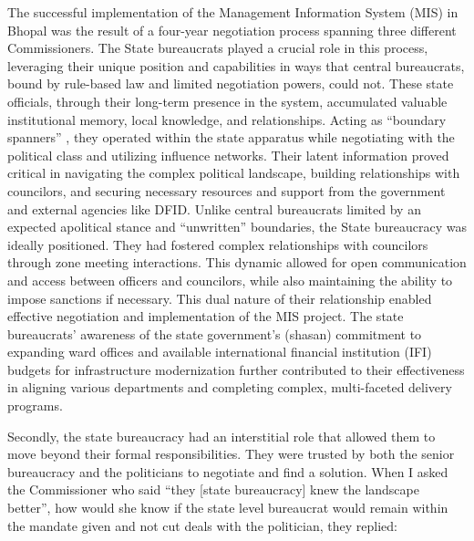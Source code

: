 The successful implementation of the Management Information System (MIS) in Bhopal was the result of a four-year negotiation process spanning three different Commissioners. The State bureaucrats played a crucial role in this process, leveraging their unique position and capabilities in ways that central bureaucrats, bound by rule-based law and limited negotiation powers, could not. These state officials, through their long-term presence in the system, accumulated valuable institutional memory, local knowledge, and relationships. Acting as ``boundary spanners'' \citep{Tushman1981}, they operated within the state apparatus while negotiating with the political class and utilizing influence networks. Their latent information proved critical in navigating the complex political landscape, building relationships with councilors, and securing necessary resources and support from the government and external agencies like DFID. Unlike central bureaucrats limited by an expected apolitical stance and ``unwritten'' boundaries, the State bureaucracy was ideally positioned. They had fostered complex relationships with councilors through zone meeting interactions. This dynamic allowed for open communication and access between officers and councilors, while also maintaining the ability to impose sanctions if necessary. This dual nature of their relationship enabled effective negotiation and implementation of the MIS project. The state bureaucrats' awareness of the state government's (shasan) commitment to expanding ward offices and available international financial institution (IFI) budgets for infrastructure modernization further contributed to their effectiveness in aligning various departments and completing complex, multi-faceted delivery programs.

Secondly, the state bureaucracy had an interstitial role that allowed them to move beyond their formal responsibilities. They were trusted by both the senior bureaucracy and the politicians to negotiate and find a solution. When I asked the Commissioner who said ``they [state bureaucracy] knew the landscape better'', how would she know if the state level bureaucrat would remain within the mandate given and not cut deals with the politician, they replied:

